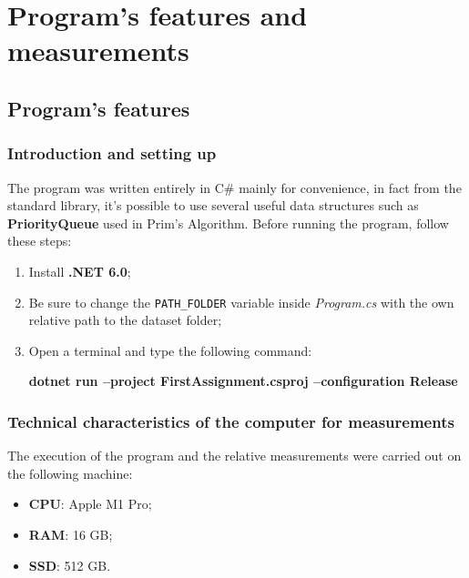 \section{Program's features and measurements}

\subsection{Program's features}

\subsubsection{Introduction and setting up}
The program was written entirely in C\# mainly for convenience, in fact from the standard library, it's possible to 
use several useful data structures such as \textbf{PriorityQueue} used in Prim's Algorithm.
Before running the program, follow these steps:
\begin{enumerate}
    \item Install \textbf{.NET 6.0};
    \item Be sure to change the \verb|PATH_FOLDER| variable inside \textit{Program.cs} with the own relative path to the dataset folder;
    \item Open a terminal and type the following command:\\
        \centerline{\textbf{dotnet run --project FirstAssignment.csproj --configuration Release}}
\end{enumerate}

\subsubsection{Technical characteristics of the computer for measurements}
The execution of the program and the relative measurements were carried out on the following machine:
\begin{itemize}
    \item \textbf{CPU}: Apple M1 Pro;
    \item \textbf{RAM}: 16 GB;
    \item \textbf{SSD}: 512 GB.
\end{itemize}

